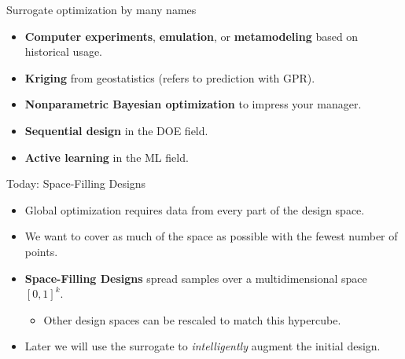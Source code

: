 \documentclass[
  9pt,
  ignorenonframetext,
]{beamer}
\providecommand{\tightlist}{%
  \setlength{\itemsep}{0pt}\setlength{\parskip}{0pt}}
\begin{document}
\begin{frame}{Surrogate optimization by many names}
\protect\hypertarget{surrogate-optimization-by-many-names}{}
\begin{itemize}
\tightlist
\item
  \textbf{Computer experiments}, \textbf{emulation}, or
  \textbf{metamodeling} based on historical usage.
\item
  \textbf{Kriging} from geostatistics (refers to prediction with GPR).
\item
  \textbf{Nonparametric Bayesian optimization} to impress your manager.
\item
  \textbf{Sequential design} in the DOE field.
\item
  \textbf{Active learning} in the ML field.
\end{itemize}
\end{frame}

\begin{frame}{Today: Space-Filling Designs}
\protect\hypertarget{today-space-filling-designs}{}
\begin{itemize}
\tightlist
\item
  Global optimization requires data from every part of the design space.
\item
  We want to cover as much of the space as possible with the fewest
  number of points.
\item
  \textbf{Space-Filling Designs} spread samples over a multidimensional
  space \([0,1]^k\).

  \begin{itemize}
  \tightlist
  \item
    Other design spaces can be rescaled to match this hypercube.
  \end{itemize}
\item
  Later we will use the surrogate to \emph{intelligently} augment the
  initial design.
\end{itemize}
\end{frame}
\end{document}
